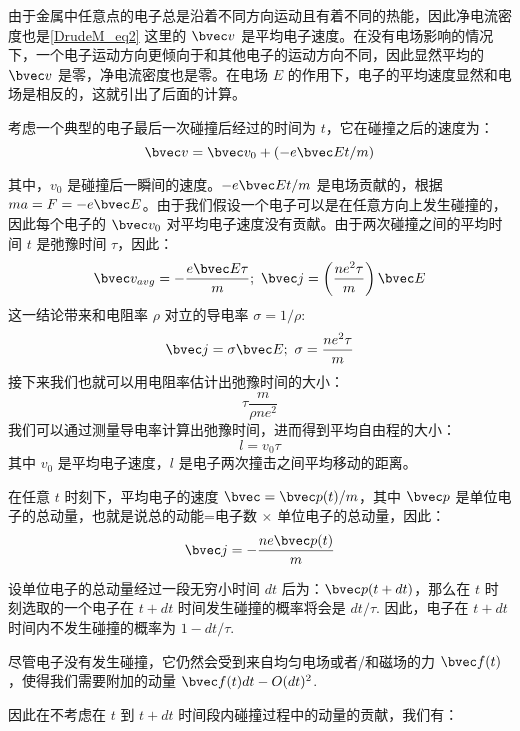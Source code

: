 由于金属中任意点的电子总是沿着不同方向运动且有着不同的热能，因此净电流密度也是\autoref{DrudeM_eq2} 这里的 $\bvec v$ 是平均电子速度。在没有电场影响的情况下，一个电子运动方向更倾向于和其他电子的运动方向不同，因此显然平均的 $\bvec v$ 是零，净电流密度也是零。在电场 $E$ 的作用下，电子的平均速度显然和电场是相反的，这就引出了后面的计算。

考虑一个典型的电子最后一次碰撞后经过的时间为 $t$，它在碰撞之后的速度为：
\begin{equation}
\bvec v = \bvec v_0 + (-e\bvec E t/m)
\end{equation}

其中，$v_0$ 是碰撞后一瞬间的速度。$-e\bvec E t/m$ 是电场贡献的，根据 $ma = F = -e\bvec E$。由于我们假设一个电子可以是在任意方向上发生碰撞的，因此每个电子的 $\bvec v_0$ 对平均电子速度没有贡献。由于两次碰撞之间的平均时间 $t$ 是弛豫时间 $\tau$，因此：
\begin{equation}
\bvec v_{avg} = -\frac{e\bvec E \tau}{m}; \ \bvec j =\left(\frac{ne^2\tau}{m}\right)\bvec E
\end{equation}
这一结论带来和电阻率 $\rho$ 对立的导电率 $\sigma = 1/\rho$:
\begin{equation}\label{DrudeM_eq4}
\bvec j = \sigma \bvec E; \ \sigma = \frac{ne^2\tau}{m}
\end{equation}
接下来我们也就可以用电阻率估计出弛豫时间的大小：
\begin{equation}
\tau \frac{m}{\rho n e^2}
\end{equation}
我们可以通过测量导电率计算出弛豫时间，进而得到平均自由程的大小：
\begin{equation}
l=v_0\tau
\end{equation}
其中 $v_0$ 是平均电子速度，$l$ 是电子两次撞击之间平均移动的距离。

在任意 $t$ 时刻下，平均电子的速度 $\bvec=\bvec p(t)/m$，其中 $\bvec p$ 是单位电子的总动量，也就是说总的动能=电子数 $\times$ 单位电子的总动量，因此：
\begin{equation}
\bvec j= -\frac{ne\bvec p(t)}{m}
\end{equation}

设单位电子的总动量经过一段无穷小时间 $dt$ 后为：$\bvec p (t+dt)$，那么在 $t$ 时刻选取的一个电子在 $t+dt$ 时间发生碰撞的概率将会是 $dt/\tau$. 因此，电子在 $t+dt$ 时间内不发生碰撞的概率为 $1-dt/\tau$.

尽管电子没有发生碰撞，它仍然会受到来自均匀电场或者/和磁场的力 $\bvec f(t)$，使得我们需要附加的动量 $\bvec f(t)dt - O(dt)^2$.

因此在不考虑在 $t$ 到 $t+dt$ 时间段内碰撞过程中的动量的贡献，我们有：

